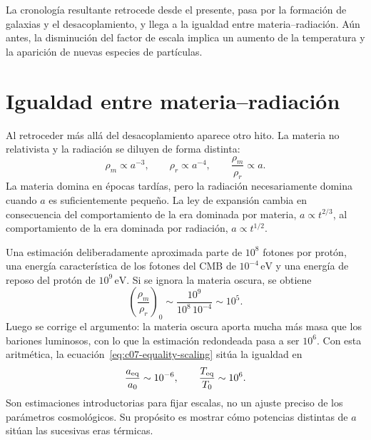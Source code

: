 \begin{classroomqa}
\end{classroomqa}

La cronología resultante retrocede desde el presente, pasa por la formación de galaxias y el desacoplamiento, y llega a la igualdad entre materia--radiación. Aún antes, la disminución del factor de escala implica un aumento de la temperatura y la aparición de nuevas especies de partículas.

\section{Igualdad entre materia--radiación}

Al retroceder más allá del desacoplamiento aparece otro hito. La materia no relativista y la radiación se diluyen de forma distinta:
\begin{equation}
\rho_m\propto a^{-3},
\qquad
\rho_r\propto a^{-4},
\qquad
\frac{\rho_m}{\rho_r}\propto a.
\label{eq:c07-equality-scaling}
\end{equation}
La materia domina en épocas tardías, pero la radiación necesariamente domina cuando \(a\) es suficientemente pequeño. La ley de expansión cambia en consecuencia del comportamiento de la era dominada por materia, \(a\propto t^{2/3}\), al comportamiento de la era dominada por radiación, \(a\propto t^{1/2}\).

Una estimación deliberadamente aproximada parte de \(10^8\) fotones por protón, una energía característica de los fotones del CMB de \(10^{-4}\,\mathrm{eV}\) y una energía de reposo del protón de \(10^9\,\mathrm{eV}\). Si se ignora la materia oscura, se obtiene
\begin{equation}
\left(\frac{\rho_m}{\rho_r}\right)_0
\sim
\frac{10^9}{10^8\,10^{-4}}
\sim10^5.
\end{equation}
Luego se corrige el argumento: la materia oscura aporta mucha más masa que los bariones luminosos, con lo que la estimación redondeada pasa a ser \(10^6\). Con esta aritmética, la ecuación~\eqref{eq:c07-equality-scaling} sitúa la igualdad en
\begin{equation}
\frac{a_{\rm eq}}{a_0}\sim10^{-6},
\qquad
\frac{T_{\rm eq}}{T_0}\sim10^6.
\label{eq:c07-equality-estimate}
\end{equation}
Son estimaciones introductorias para fijar escalas, no un ajuste preciso de los parámetros cosmológicos. Su propósito es mostrar cómo potencias distintas de \(a\) sitúan las sucesivas eras térmicas.

